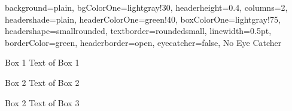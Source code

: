 \documentclass[portrait,fontscale=0.7,margin=0.7cm,paperwidth=15truecm, paperheight=9truecm,debug]{baposter}
\begin{document}
\begin{poster}{
  background=plain,
  bgColorOne=lightgray!30,
  headerheight=0.4\textheight,
  columns=2,
  headershade=plain,
  headerColorOne=green!40,
  boxColorOne=lightgray!75,
  headershape=smallrounded,
  textborder=roundedsmall,
  linewidth=0.5pt,
  borderColor=green,
  headerborder=open,
  eyecatcher=false,
}{No Eye Catcher}{}{}{}

\begin{posterbox}[column=0]{Box 1}
Text of Box 1
\end{posterbox}

\begin{posterbox}[column=0,below=auto,height=bottom]{Box 2}
Text of Box 2
\end{posterbox}

\begin{posterbox}[column=1,height=bottom]{Box 2}
Text of Box 3
\end{posterbox}

\end{poster}
\end{document}
